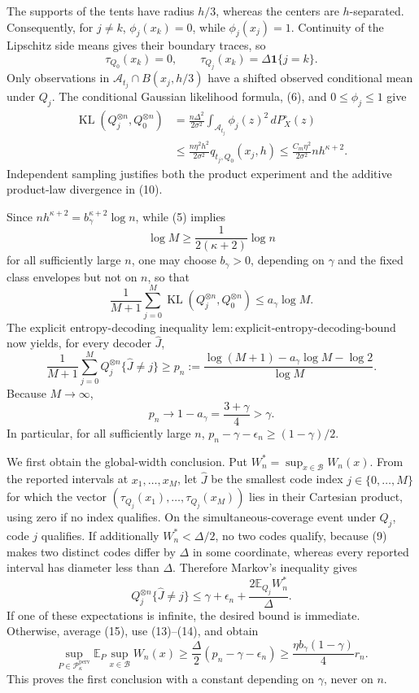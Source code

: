 The supports of the tents have radius \(h/3\), whereas the centers are \(h\)-separated. Consequently, for \(j\ne k\), \(\phi_j(x_k)=0\), while \(\phi_j(x_j)=1\). Continuity of the Lipschitz side means gives their boundary traces, so
\[
 \tau_{Q_0}(x_k)=0,
 \qquad
 \tau_{Q_j}(x_k)=\Delta\mathbf 1\{j=k\}. \tag{9}
\]
Only observations in \(\mathcal A_{t_j}\cap B(x_j,h/3)\) have a shifted observed conditional mean under \(Q_j\). The conditional Gaussian likelihood formula, (6), and \(0\le\phi_j\le1\) give
\[
 \begin{aligned}
 \operatorname{KL}(Q_j^{\otimes n},Q_0^{\otimes n})
 &=\frac{n\Delta^2}{2\sigma^2}
   \int_{\mathcal A_{t_j}}\phi_j(z)^2\,dP_X^\circ(z)\\
 &\le\frac{n\eta^2h^2}{2\sigma^2}q_{t_j,Q_0}(x_j,h)
 \le \frac{C_m\eta^2}{2\sigma^2}nh^{\kappa+2}. 
 \end{aligned} \tag{10}
\]
Independent sampling justifies both the product experiment and the additive product-law divergence in (10).

Since \(nh^{\kappa+2}=b_\gamma^{\kappa+2}\log n\), while (5) implies
\[
 \log M\ge \frac{1}{2(\kappa+2)}\log n \tag{11}
\]
for all sufficiently large \(n\), one may choose \(b_\gamma>0\), depending on \(\gamma\) and the fixed class envelopes but not on \(n\), so that
\[
 \frac1{M+1}\sum_{j=0}^M
 \operatorname{KL}(Q_j^{\otimes n},Q_0^{\otimes n})
 \le a_\gamma\log M. \tag{12}
\]
The explicit entropy-decoding inequality \(\mathrm{lem:explicit\text{-}entropy\text{-}decoding\text{-}bound}\) now yields, for every decoder \(\widehat J\),
\[
 \frac1{M+1}\sum_{j=0}^M Q_j^{\otimes n}\{\widehat J\ne j\}
 \ge p_n:=\frac{\log(M+1)-a_\gamma\log M-\log2}{\log M}. \tag{13}
\]
Because \(M\to\infty\),
\[
 p_n\longrightarrow1-a_\gamma=\frac{3+\gamma}{4}>\gamma. \tag{14}
\]
In particular, for all sufficiently large \(n\), \(p_n-\gamma-\epsilon_n\ge(1-\gamma)/2\).

We first obtain the global-width conclusion. Put \(W_n^*=\sup_{x\in\mathcal B}W_n(x)\). From the reported intervals at \(x_1,\ldots,x_M\), let \(\widehat J\) be the smallest code index \(j\in\{0,\ldots,M\}\) for which the vector \((\tau_{Q_j}(x_1),\ldots,\tau_{Q_j}(x_M))\) lies in their Cartesian product, using zero if no index qualifies. On the simultaneous-coverage event under \(Q_j\), code \(j\) qualifies. If additionally \(W_n^*<\Delta/2\), no two codes qualify, because (9) makes two distinct codes differ by \(\Delta\) in some coordinate, whereas every reported interval has diameter less than \(\Delta\). Therefore Markov's inequality gives
\[
 Q_j^{\otimes n}\{\widehat J\ne j\}
 \le\gamma+\epsilon_n+
 \frac{2\mathbb E_{Q_j}W_n^*}{\Delta}. \tag{15}
\]
If one of these expectations is infinite, the desired bound is immediate. Otherwise, average (15), use (13)--(14), and obtain
\[
 \sup_{P\in\mathcal P_{\kappa}^{\mathrm{perv}}}
 \mathbb E_P\sup_{x\in\mathcal B}W_n(x)
 \ge\frac{\Delta}{2}(p_n-\gamma-\epsilon_n)
 \ge\frac{\eta b_\gamma(1-\gamma)}4 r_n. \tag{16}
\]
This proves the first conclusion with a constant depending on \(\gamma\), never on \(n\).

